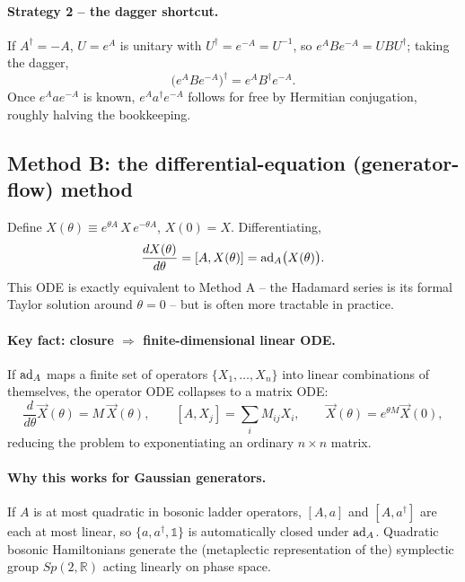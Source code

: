 \documentclass[../main.tex]{subfiles}
\begin{document}
\paragraph{Strategy 2 -- the dagger shortcut.}
If $A^\dagger=-A$, $U=e^A$ is unitary with $U^\dagger=e^{-A}=U^{-1}$, so
$e^{A}Be^{-A}=UBU^\dagger$; taking the dagger,
\begin{equation}
\big(e^{A}Be^{-A}\big)^\dagger = e^{A}B^\dagger e^{-A}.
\end{equation}
Once $e^{A}ae^{-A}$ is known, $e^{A}a^\dagger e^{-A}$ follows for free by Hermitian
conjugation, roughly halving the bookkeeping.

\subsection{Method B: the differential-equation (generator-flow) method}

Define $X(\theta)\equiv e^{\theta A}\,X\,e^{-\theta A}$, $X(0)=X$. Differentiating,
\begin{equation}
\frac{dX(\theta)}{d\theta}=[A,X(\theta)]=\mathrm{ad}_A\big(X(\theta)\big).
\end{equation}
This ODE is exactly equivalent to Method A -- the Hadamard series is its formal Taylor
solution around $\theta=0$ -- but is often more tractable in practice.

\paragraph{Key fact: closure $\Rightarrow$ finite-dimensional linear ODE.}
If $\mathrm{ad}_A$ maps a finite set of operators $\{X_1,\dots,X_n\}$ into linear combinations
of themselves, the operator ODE collapses to a matrix ODE:
\begin{equation}
\frac{d}{d\theta}\vec X(\theta)=M\,\vec X(\theta),\qquad
[A,X_j]=\sum_iM_{ij}X_i,\qquad \vec X(\theta)=e^{\theta M}\vec X(0),
\end{equation}
reducing the problem to exponentiating an ordinary $n\times n$ matrix.

\paragraph{Why this works for Gaussian generators.}
If $A$ is at most quadratic in bosonic ladder operators, $[A,a]$ and $[A,a^\dagger]$ are
each at most linear, so $\{a,a^\dagger,\mathbb1\}$ is automatically closed under
$\mathrm{ad}_A$. Quadratic bosonic Hamiltonians generate the (metaplectic representation of the)
symplectic group $Sp(2,\mathbb R)$ acting linearly on phase space.
\end{document}
